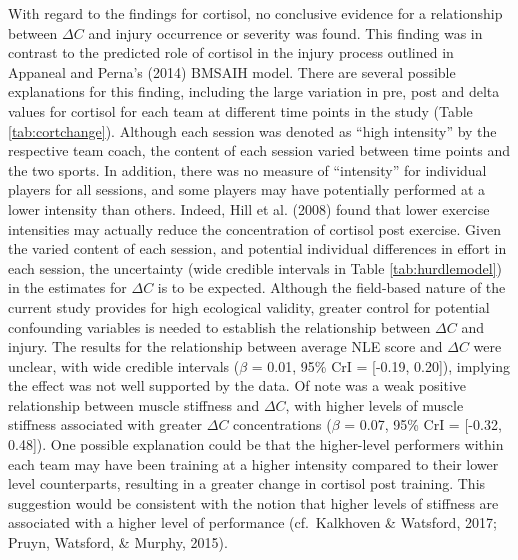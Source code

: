 \documentclass[
  english,
  man,floatsintext]{apa6}
\begin{document}
With regard to the findings for cortisol, no conclusive evidence for a relationship between \(\Delta C\) and injury occurrence or severity was found.
This finding was in contrast to the predicted role of cortisol in the injury process outlined in Appaneal and Perna's (2014) BMSAIH model.
There are several possible explanations for this finding, including the large variation in pre, post and delta values for cortisol for each team at different time points in the study (Table \ref{tab:cortchange}).
Although each session was denoted as \enquote{high intensity} by the respective team coach, the content of each session varied between time points and the two sports.
In addition, there was no measure of \enquote{intensity} for individual players for all sessions, and some players may have potentially performed at a lower intensity than others.
Indeed, Hill et al. (2008) found that lower exercise intensities may actually reduce the concentration of cortisol post exercise.
Given the varied content of each session, and potential individual differences in effort in each session, the uncertainty (wide credible intervals in Table \ref{tab:hurdlemodel}) in the estimates for \(\Delta C\) is to be expected.
Although the field-based nature of the current study provides for high ecological validity, greater control for potential confounding variables is needed to establish the relationship between \(\Delta C\) and injury.
The results for the relationship between average NLE score and \(\Delta C\) were unclear, with wide credible intervals (\(\beta\) = 0.01, 95\% CrI = {[}-0.19, 0.20{]}), implying the effect was not well supported by the data.
Of note was a weak positive relationship between muscle stiffness and \(\Delta C\), with higher levels of muscle stiffness associated with greater \(\Delta C\) concentrations (\(\beta\) = 0.07, 95\% CrI = {[}-0.32, 0.48{]}).
One possible explanation could be that the higher-level performers within each team may have been training at a higher intensity compared to their lower level counterparts, resulting in a greater change in cortisol post training.
This suggestion would be consistent with the notion that higher levels of stiffness are associated with a higher level of performance (cf.~Kalkhoven \& Watsford, 2017; Pruyn, Watsford, \& Murphy, 2015).
\end{document}
